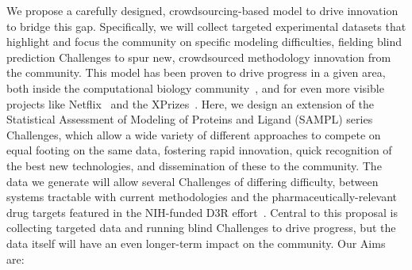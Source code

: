 \documentclass[11pt]{article}
\begin{document}
We propose a carefully designed, crowdsourcing-based model to drive innovation to bridge this gap. 
Specifically, we will collect targeted experimental datasets that highlight and focus the community on specific modeling difficulties, fielding blind prediction Challenges to spur new, crowdsourced methodology innovation from the community.
This model has been proven to drive progress in a given area, both inside the computational biology community~\cite{Moult:2014:Proteins, Monastyrskyy:2016:Proteins, Moult:2016:Proteins, Prill:2011:Sci.Signal., Eisenstein:2013:NatBiotech, Saez-Rodriguez:2016:NatRevGenet}, and for even more visible projects like Netflix~\cite{Bell:2010:CHANCE} and the XPrizes~\cite{::XPRIZE, Kay:2011:R&DManage, XPrize:2017:Wikipedia}. 
Here, we design an extension of the Statistical Assessment of Modeling of Proteins and Ligand (SAMPL) series Challenges, which allow a wide variety of different approaches to compete on equal footing on the same data, fostering rapid innovation, quick recognition of the best new technologies, and dissemination of these to the community. 
The data we generate will allow several Challenges of differing difficulty, between systems tractable with current methodologies and the pharmaceutically-relevant drug targets featured in the NIH-funded D3R effort~\cite{Gathiaka:2016:JComputAidedMolDes}.
Central to this proposal is collecting targeted data and running blind Challenges to drive progress, but the data itself will have an even longer-term impact on the community.
Our Aims are:
\end{document}
